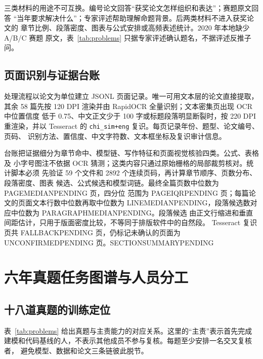 \documentclass[UTF8,a4paper,12pt]{ctexart}
\newcommand{\CorpusPageMedian}{PAGEMEDIANPENDING}
\newcommand{\CorpusPageIQR}{PAGEIQRPENDING}
\newcommand{\CorpusLineMedian}{LINEMEDIANPENDING}
\newcommand{\CorpusParagraphMedian}{PARAGRAPHMEDIANPENDING}
\newcommand{\CorpusFallbackPages}{FALLBACKPENDING}
\newcommand{\CorpusUnconfirmedPages}{UNCONFIRMEDPENDING}
\newcommand{\CorpusSectionSummary}{SECTIONSUMMARYPENDING}
\begin{document}
三类材料的用途不可互换。编号论文回答“获奖论文怎样组织和表达”；赛题原文回答
“当年要求解决什么”；专家评述帮助理解命题背景。后两类材料不进入获奖论文的
章节比例、段落密度、图表与公式安排或高频表述统计。2020 年本地缺少 A/B/C 赛题
原文，表~\ref{tab:problems} 只据专家评述确认题名，不据评述反推子问。

\subsection{页面识别与证据台账}

处理流程以论文为单位建立 JSONL 页面记录。唯一可用文本层的论文直接提取，其余
58 篇先按 120 DPI 渲染并由 RapidOCR 全量识别；文本密集页出现 OCR 中位置信度
低于 0.75、中文正文少于 100 字或标题段落明显断裂时，按 220 DPI 重渲染，并以
Tesseract 的 \texttt{chi\_sim+eng} 复识。每页记录年份、题型、论文编号、页码、
识别方法、置信度、中文字符数、文本框坐标及复识审计信息。

台账把证据细分为章节命中、模型链、写作特征和页面视觉核验四类。公式、表格及
小字号图注不依据 OCR 猜测；这类内容只通过原始栅格的局部裁剪核对。统计脚本必须
先验证 59 个文件和 2892 个连续页码，再计算章节顺序、页数分布、段落密度、图表
候选、公式候选和模型词链。最终全篇页数中位数为 \CorpusPageMedian{} 页，四分位
范围为 \CorpusPageIQR{} 页；每篇论文的页面文本行数中位数再取中位数为
\CorpusLineMedian{}，段落候选数对应中位数为 \CorpusParagraphMedian{}。段落候选
由正文行缩进和垂直间距估计，只用于版面密度比较，不等同于排版软件中的自然段。
Tesseract 复识页共 \CorpusFallbackPages{} 页，仍标记未确认的页面为
\CorpusUnconfirmedPages{} 页。\CorpusSectionSummary

\section{六年真题任务图谱与人员分工}

\subsection{十八道真题的训练定位}

表~\ref{tab:problems} 给出真题与主责能力的对应关系。这里的“主责”表示首先完成
建模和代码基线的人，不表示其他成员不参与复核。每题至少安排一名交叉复核者，
避免模型、数据和论文三条链彼此脱节。
\end{document}
